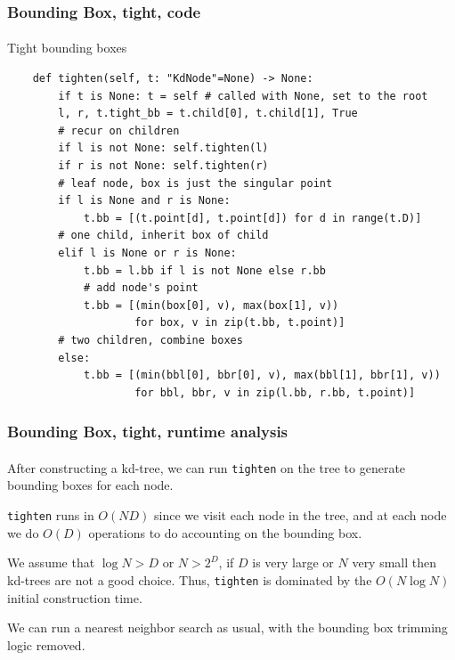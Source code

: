 \documentclass{beamer}                             %
\begin{document}
\begin{frame}[fragile]
\frametitle{Bounding Box, tight, code}
\framesubtitle{}
\begin{algorithm}[H]
  \caption{Tight bounding boxes}
  \begin{verbatim}
    def tighten(self, t: "KdNode"=None) -> None:
        if t is None: t = self # called with None, set to the root 
        l, r, t.tight_bb = t.child[0], t.child[1], True
        # recur on children
        if l is not None: self.tighten(l)
        if r is not None: self.tighten(r)
        # leaf node, box is just the singular point
        if l is None and r is None:
            t.bb = [(t.point[d], t.point[d]) for d in range(t.D)]
        # one child, inherit box of child
        elif l is None or r is None:
            t.bb = l.bb if l is not None else r.bb
            # add node's point
            t.bb = [(min(box[0], v), max(box[1], v))
                    for box, v in zip(t.bb, t.point)]
        # two children, combine boxes
        else:
            t.bb = [(min(bbl[0], bbr[0], v), max(bbl[1], bbr[1], v))
                    for bbl, bbr, v in zip(l.bb, r.bb, t.point)]
  \end{verbatim}
\end{algorithm}
\end{frame}

\begin{frame}
\frametitle{Bounding Box, tight, runtime analysis}
\framesubtitle{}
After constructing a kd-tree, we can run \texttt{tighten} on the tree
to generate bounding boxes for each node.

\texttt{tighten} runs in \( O(ND) \) since we visit each node in the tree,
and at each node we do \( O(D) \) operations 
to do accounting on the bounding box. \pause

We assume that \( \log N > D \) or \( N > 2^D \), if \( D \) is very large
or \( N \) very small then kd-trees are not a good choice.
Thus, \texttt{tighten} is dominated by the \( O(N \log N) \) initial
construction time. \pause

We can run a nearest neighbor search as usual,
with the bounding box trimming logic removed.
\end{frame}
\end{document}
